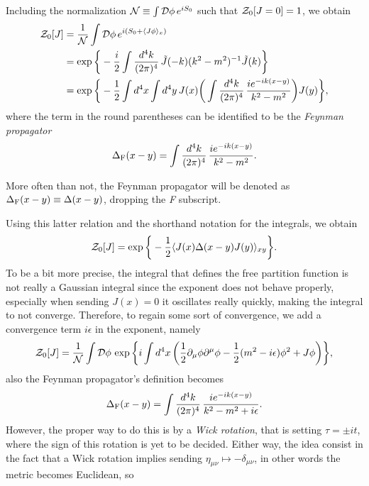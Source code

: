 Including the normalization $\mathcal{N} \equiv \int \mathcal{D}\phi\,e^{iS_0}$ such that $\mathcal{Z}_0[J = 0] = 1$, we obtain
\begin{equation}
    \begin{split}
        \mathcal{Z}_0[J] &= \frac{1}{\mathcal{N}}\int \mathcal{D}\phi\,e^{i(S_0 + \langle J\phi \rangle_x)} \\
        &= \exp{\bigg\{-\frac{i}{2}\int\frac{d^4k}{(2\pi)^4}\,\tilde{J}(-k)(k^2 - m^2)^{-1}\tilde{J}(k)\bigg\}} \\
        &= \exp{\bigg\{-\frac{1}{2}\int d^4x\int d^4y\,J(x)\bigg(\int\frac{d^4k}{(2\pi)^4}\,\frac{ie^{-ik(x - y)}}{k^2 - m^2}\bigg)J(y)\bigg\}},
    \end{split}
\end{equation}
where the term in the round parentheses can be identified to be the \emph{Feynman propagator}
\begin{eqnarray}
    \Delta_{\mathrm{F}}(x - y) = \int\frac{d^4k}{(2\pi)^4}\,\frac{ie^{-ik(x - y)}}{k^2 - m^2}.
\end{eqnarray}
\begin{notz}
    More often than not, the Feynman propagator will be denoted as $\Delta_{\mathrm{F}}(x - y) \equiv \Delta (x - y)$, dropping the \emph{F} subscript. 
\end{notz}
Using this latter relation and the shorthand notation for the integrals, we obtain 
\begin{equation}
    \mathcal{Z}_0[J] = \exp{\bigg\{-\frac{1}{2}\langle J(x)\Delta(x - y)J(y) \rangle_{xy}\bigg\}}.
\end{equation}
To be a bit more precise, the integral that defines the free partition function is not really a Gaussian integral since the exponent does not behave properly, especially when sending $J(x) = 0$ it oscillates really quickly, making the integral to not converge. Therefore, to regain some sort of convergence, we add a convergence term $i\epsilon$ in the exponent, namely 
\begin{equation}
    \mathcal{Z}_0[J] = \frac{1}{\mathcal{N}}\int \mathcal{D}\phi\,\exp{\bigg\{i\int d^4x\,\bigg(\frac{1}{2}\partial_\mu\phi\partial^\mu\phi - \frac{1}{2}(m^2 - i\epsilon)\phi^2 + J\phi\bigg)\bigg\}},
\end{equation}
also the Feynman propagator's definition becomes  
\begin{equation}
    \Delta_{\mathrm{F}}(x - y) = \int\frac{d^4k}{(2\pi)^4}\,\frac{ie^{-ik(x - y)}}{k^2 - m^2 + i\epsilon}.
\end{equation}
However, the proper way to do this is by a \emph{Wick rotation}, that is setting $\tau = \pm it$, where the sign of this rotation is yet to be decided. Either way, the idea consist in the fact that a Wick rotation implies sending $\eta_{\mu\nu} \mapsto -\delta_{\mu\nu}$, in other words the metric becomes Euclidean, so 
